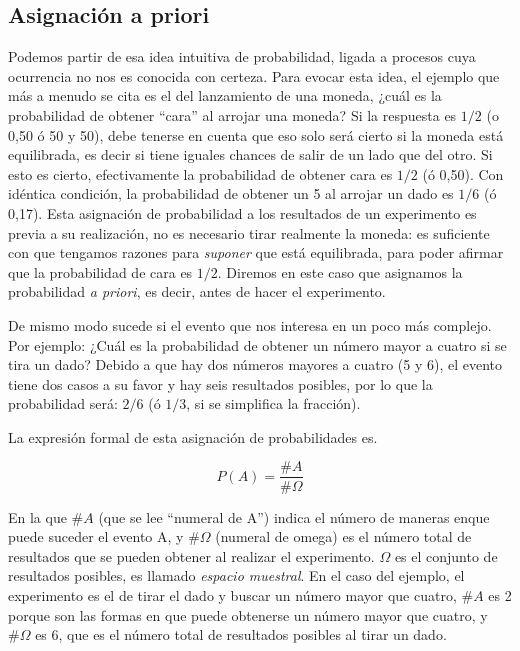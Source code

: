 \documentclass[]{book}
\begin{document}
\hypertarget{asignaciuxf3n-a-priori}{%
\subsection{Asignación a priori}\label{asignaciuxf3n-a-priori}}

Podemos partir de esa idea intuitiva de probabilidad, ligada a procesos
cuya ocurrencia no nos es conocida con certeza. Para evocar esta idea,
el ejemplo que más a menudo se cita es el del lanzamiento de una moneda,
¿cuál es la probabilidad de obtener ``cara'' al arrojar una moneda? Si la
respuesta es \(1/2\) (o 0,50 ó 50 y 50), debe tenerse en cuenta que eso solo
será cierto si la moneda está equilibrada, es decir si tiene iguales
chances de salir de un lado que del otro. Si esto es cierto,
efectivamente la probabilidad de obtener cara es \(1/2\) (ó 0,50). Con
idéntica condición, la probabilidad de obtener un 5 al arrojar un dado
es \(1/6\) (ó 0,17). Esta asignación de probabilidad a los resultados de un
experimento es previa a su realización, no es necesario tirar realmente
la moneda: es suficiente con que tengamos razones para \emph{suponer} que
está equilibrada, para poder afirmar que la probabilidad de cara es \(1/2\).
Diremos en este caso que asignamos la probabilidad \emph{a priori}, es decir,
antes de hacer el experimento.

De mismo modo sucede si el evento que nos interesa en un poco más
complejo. Por ejemplo: ¿Cuál es la probabilidad de obtener un número
mayor a cuatro si se tira un dado? Debido a que hay dos números mayores
a cuatro (5 y 6), el evento tiene dos casos a su favor y hay seis
resultados posibles, por lo que la probabilidad será: \(2/6\) (ó \(1/3\), si se
simplifica la fracción).

La expresión formal de esta asignación de probabilidades es.

\[P(A)=\frac{\#A}{\#\Omega}\]

En la que \(\#A\) (que se lee ``numeral de A'') indica el número de maneras enque puede suceder el evento A, y \(\#\Omega\) (numeral de omega) es el número
total de resultados que se pueden obtener al realizar el experimento. \(\Omega\)
es el conjunto de resultados posibles, es llamado \emph{espacio muestral}. En
el caso del ejemplo, el experimento es el de tirar el dado y buscar un
número mayor que cuatro, \(\#A\) es 2 porque son las formas en que puede
obtenerse un número mayor que cuatro, y \(\#\Omega\) es 6, que es el número total
de resultados posibles al tirar un dado.
\end{document}

